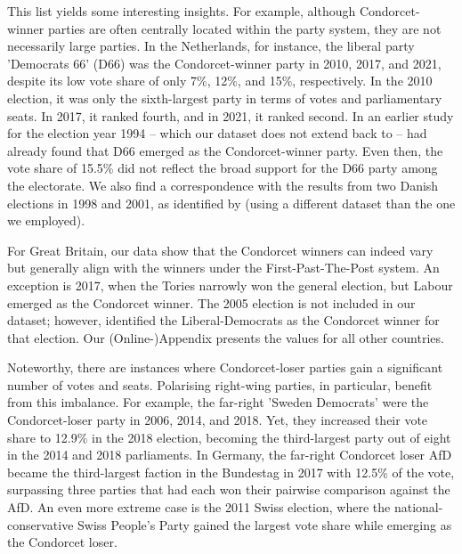 \documentclass[12pt]{scrartcl}
\begin{document}


This list yields some interesting insights. For example, although Condorcet-winner parties are often centrally located within the party system, they are not necessarily large parties. In the Netherlands, for instance, the liberal party 'Democrats 66' (D66) was the Condorcet-winner party in 2010, 2017, and 2021, despite its low vote share of only 7\%, 12\%, and 15\%, respectively. In the 2010 election, it was only the sixth-largest party in terms of votes and parliamentary seats. In 2017, it ranked fourth, and in 2021, it ranked second. In an earlier study for the election year 1994 -- which our dataset does not extend back to -- \cite{vanDeemen1998} had already found that D66 emerged as the Condorcet-winner party. Even then, the vote share of 15.5\% did not reflect the broad support for the D66 party among the electorate. We also find a correspondence with the results from two Danish elections in 1998 and 2001, as identified by \cite{KurrildKlitgaard2008} (using a different dataset than the one we employed). 

For Great Britain, our data show that the Condorcet winners can indeed vary but generally align with the winners under the First-Past-The-Post system. An exception is 2017, when the Tories narrowly won the general election, but Labour emerged as the Condorcet winner. The 2005 election is not included in our dataset; however, \cite{Abramson2013} identified the Liberal-Democrats as the Condorcet winner for that election. Our (Online-)Appendix presents the values for all other countries.

Noteworthy, there are instances where Condorcet-loser parties gain a significant number of votes and seats. Polarising right-wing parties, in particular, benefit from this imbalance. For example, the far-right 'Sweden Democrats' were the Condorcet-loser party in 2006, 2014, and 2018. Yet, they increased their vote share to 12.9\% in the 2018 election, becoming the third-largest party out of eight in the 2014 and 2018 parliaments. In Germany, the far-right Condorcet loser AfD became the third-largest faction in the Bundestag in 2017 with 12.5\% of the vote, surpassing three parties that had each won their pairwise comparison against the AfD. An even more extreme case is the 2011 Swiss election, where the national-conservative Swiss People's Party gained the largest vote share while emerging as the Condorcet loser. 
\end{document}
